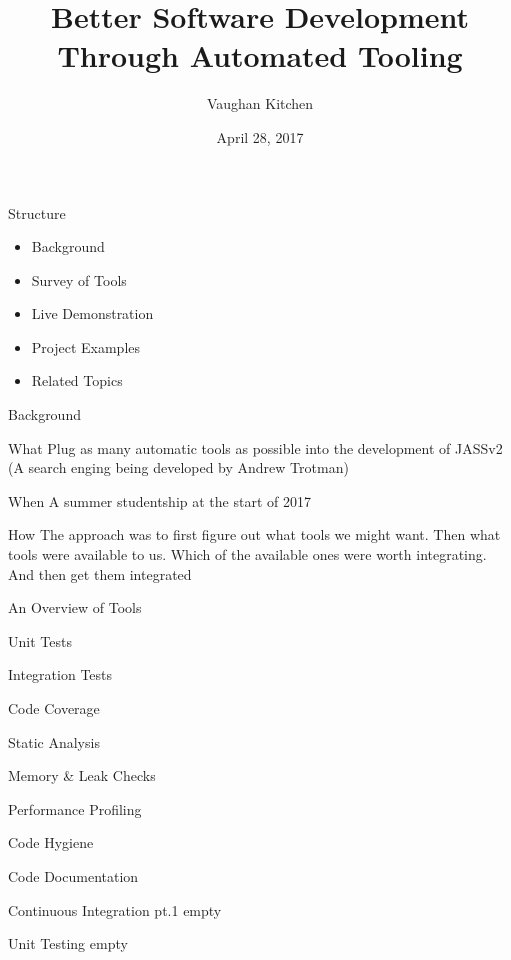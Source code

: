 \documentclass{beamer}
\title{Better Software Development Through Automated Tooling}
\author{Vaughan Kitchen}
\date{April 28, 2017}
\begin{document}
\begin{frame}
\titlepage
\end{frame}

\begin{frame}{Structure}
\begin{itemize}
	\item Background
	\item Survey of Tools
	\item Live Demonstration
	\item Project Examples
	\item Related Topics
\end{itemize}
\end{frame}

\begin{frame}{Background}
	\begin{block}{What}
		Plug as many automatic tools as possible into the development of JASSv2
		(A search enging being developed by Andrew Trotman)
	\end{block}
	\begin{block}{When}
		A summer studentship at the start of 2017
	\end{block}
	\begin{block}{How}
		The approach was to first figure out what tools we might want. Then what
		tools were available to us. Which of the available ones were worth
		integrating. And then get them integrated
	\end{block}
\end{frame}

\begin{frame}{An Overview of Tools}
	\item Unit Tests
	\item Integration Tests
	\item Code Coverage
	\item Static Analysis
	\item Memory & Leak Checks
	\item Performance Profiling
	\item Code Hygiene
	\item Code Documentation
\end{frame}

\begin{frame}{Continuous Integration pt.1}
	empty
\end{frame}

\begin{frame}{Unit Testing}
	empty
\end{frame}
\end{document}
